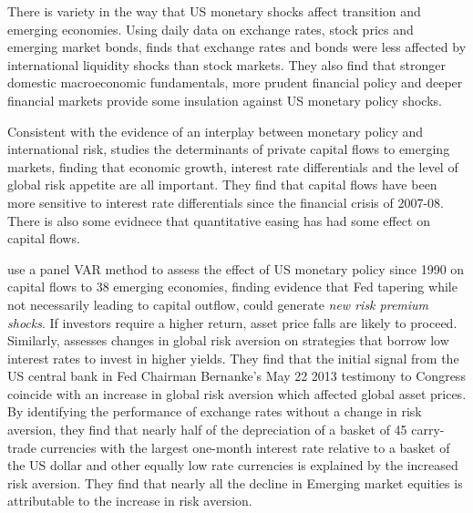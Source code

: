 \documentclass[12pt, a4paper, oneside]{article} %
\begin{document}
There is variety in the way that US monetary shocks affect transition and emerging economies.  Using daily data on exchange rates, stock prics and emerging market bonds, \citet{Tapering} finds that exchange rates and bonds were less affected by international liquidity shocks than stock markets.  They also find that stronger domestic macroeconomic fundamentals, more prudent financial policy and deeper financial markets provide some insulation against US monetary policy shocks. 

Consistent with the evidence of an interplay between monetary policy and international risk, \citet{Ahmed2014} studies the determinants of private capital flows to emerging markets, finding that economic growth, interest rate differentials and the level of global risk appetite are all important.  They find that capital flows have been more sensitive to interest rate differentials since the financial crisis of 2007-08. There is also some evidnece that quantitative easing has had some effect on capital flows. 

 \citet{IMFLatam} use a panel VAR method to assess the effect of US monetary policy since 1990 on capital flows to 38 emerging economies, finding evidence that Fed tapering while not necessarily leading to capital outflow, could generate \emph{new risk premium shocks}.   If investors require a higher return, asset price falls are likely to proceed. Similarly, \citet{NYFedtaper} assesses changes in global risk aversion on strategies that borrow low interest rates to invest in higher yields.  They find that the initial signal from the US central bank in Fed Chairman Bernanke's May 22 2013 testimony to Congress coincide with an increase in global risk aversion which affected global asset prices. %
By identifying the performance of exchange rates without a change in risk aversion, they find that nearly half of the depreciation of a basket of 45 carry-trade currencies with the largest one-month interest rate relative to a basket of the US dollar and other equally low rate currencies is explained by the increased risk aversion. They find that nearly all the decline in Emerging market equities is attributable to the increase in risk aversion.
\end{document}
